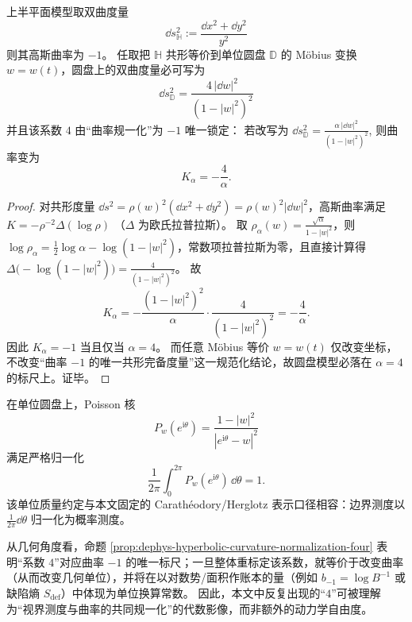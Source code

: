 \begin{proposition}\label{prop:dephys-hyperbolic-curvature-normalization-four}
上半平面模型取双曲度量
\[
\dd s_{\mathbb{H}}^{2}:=\frac{\dd x^{2}+\dd y^{2}}{y^{2}}
\]
则其高斯曲率为 \(-1\)。
任取把 \(\mathbb{H}\) 共形等价到单位圆盘 \(\mathbb{D}\) 的 Möbius 变换 \(w=w(t)\)，圆盘上的双曲度量必可写为
\[
\boxed{\;
\dd s_{\mathbb{D}}^{2}=\frac{4\,|\dd w|^{2}}{(1-|w|^{2})^{2}}\;}
\]
并且该系数 \(4\) 由“曲率规一化”为 \(-1\) 唯一锁定：
若改写为
\(
\dd s_{\mathbb{D}}^{2}=\frac{\alpha\,|\dd w|^{2}}{(1-|w|^{2})^{2}}
\),
则曲率变为
\[
\boxed{\;K_{\alpha}=-\frac{4}{\alpha}.\;}
\]
\end{proposition}

\begin{proof}
对共形度量 \(\dd s^{2}=\rho(w)^{2}(\dd x^{2}+\dd y^{2})=\rho(w)^{2}|\dd w|^{2}\)，高斯曲率满足
\(
K=-\rho^{-2}\Delta(\log\rho)
\)
（\(\Delta\) 为欧氏拉普拉斯）。
取 \(\rho_{\alpha}(w)=\frac{\sqrt{\alpha}}{1-|w|^{2}}\)，则
\(
\log\rho_{\alpha}=\frac12\log\alpha-\log(1-|w|^{2})
\)，常数项拉普拉斯为零，且直接计算得
\(
\Delta\bigl(-\log(1-|w|^{2})\bigr)=\frac{4}{(1-|w|^{2})^{2}}
\)。
故
\[
K_{\alpha}
=-\frac{(1-|w|^{2})^{2}}{\alpha}\cdot \frac{4}{(1-|w|^{2})^{2}}
=-\frac{4}{\alpha}.
\]
因此 \(K_{\alpha}=-1\) 当且仅当 \(\alpha=4\)。
而任意 Möbius 等价 \(w=w(t)\) 仅改变坐标，不改变“曲率 \(-1\) 的唯一共形完备度量”这一规范化结论，故圆盘模型必落在 \(\alpha=4\) 的标尺上。证毕。
\end{proof}

\begin{remark}\label{rem:dephys-poisson-kernel-unit-mass-curvature-gauge}
在单位圆盘上，Poisson 核
\[
P_{w}(e^{\mathrm{i}\theta})=\frac{1-|w|^{2}}{|e^{\mathrm{i}\theta}-w|^{2}}
\]
满足严格归一化
\[
\boxed{\;\frac{1}{2\pi}\int_{0}^{2\pi}P_{w}(e^{\mathrm{i}\theta})\,\dd\theta=1.\;}
\]
该单位质量约定与本文固定的 Carath\'eodory/Herglotz 表示口径相容：边界测度以 \(\frac{1}{2\pi}\dd\theta\) 归一化为概率测度。
\par
从几何角度看，命题 \ref{prop:dephys-hyperbolic-curvature-normalization-four} 表明“系数 \(4\)”对应曲率 \(-1\) 的唯一标尺；一旦整体重标定该系数，就等价于改变曲率（从而改变几何单位），并将在以对数势/面积作账本的量（例如 \(b_{-1}=\log B^{-1}\) 或缺陷熵 \(S_{\mathrm{def}}\)）中体现为单位换算常数。
因此，本文中反复出现的“\(4\)”可被理解为“视界测度与曲率的共同规一化”的代数影像，而非额外的动力学自由度。
\end{remark}

